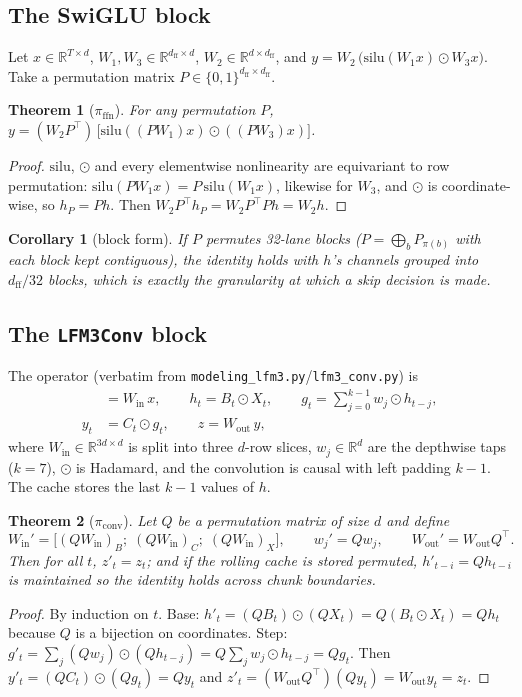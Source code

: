 \documentclass[11pt]{article}
\newtheorem{theorem}{Theorem}
\newtheorem{corollary}{Corollary}
\newcommand{\dff}{\ensuremath{d_{\mathrm{ff}}}}
\newcommand{\Wout}{\ensuremath{W_{\mathrm{out}}}}
\newcommand{\Win}{\ensuremath{W_{\mathrm{in}}}}
\newcommand{\pif}{\pi_{\mathrm{ffn}}}
\newcommand{\pic}{\pi_{\mathrm{conv}}}
\newcommand{\code}[1]{\texttt{\small #1}}
\begin{document}
\subsection{The SwiGLU block}
Let $x\in\mathbb{R}^{T\times d}$, $W_1,W_3\in\mathbb{R}^{\dff\times d}$,
$W_2\in\mathbb{R}^{d\times\dff}$, and $y = W_2\,\big(\mathrm{silu}(W_1x)\odot W_3x\big)$.
Take a permutation matrix $P\in\{0,1\}^{\dff\times\dff}$.

\begin{theorem}[$\pif$]
For any permutation $P$, $y = (W_2P^{\!\top})\,\big[\mathrm{silu}((PW_1)x)\odot((PW_3)x)\big]$.
\end{theorem}
\begin{proof}
$\mathrm{silu}$, $\odot$ and every elementwise nonlinearity are equivariant to row
permutation: $\mathrm{silu}(PW_1x) = P\,\mathrm{silu}(W_1x)$, likewise for $W_3$, and
$\odot$ is coordinate-wise, so $h_P = Ph$. Then $W_2P^{\!\top}h_P = W_2P^{\!\top}Ph = W_2h$.
\end{proof}

\begin{corollary}[block form]
If $P$ permutes \emph{32-lane blocks} ($P = \bigoplus_{b} P_{\pi(b)}$ with each block kept
contiguous), the identity holds with $h$'s channels grouped into $d_{\mathrm{ff}}/32$
blocks, which is exactly the granularity at which a skip decision is made.
\end{corollary}

\subsection{The \code{LFM3Conv} block}
The operator (verbatim from \code{modeling\_lfm3.py}/\code{lfm3\_conv.py}) is
\begin{align}
[\,B;C;X\,] &= \Win\,x, \qquad
h_t = B_t \odot X_t, \qquad
g_t = \textstyle\sum_{j=0}^{k-1} w_j \odot h_{t-j}, \label{eq:conv}\\
y_t &= C_t \odot g_t, \qquad z = \Wout\,y ,
\end{align}
where $\Win\in\mathbb{R}^{3d\times d}$ is split into three $d$-row slices, $w_j\in
\mathbb{R}^{d}$ are the depthwise taps ($k{=}7$), $\odot$ is Hadamard, and the
convolution is causal with left padding $k-1$. The cache stores the last $k-1$ values of
$h$.

\begin{theorem}[$\pic$]
Let $Q$ be a permutation matrix of size $d$ and define
\begin{equation}
\Win' = \big[(Q\Win)_{B};\;(Q\Win)_{C};\;(Q\Win)_{X}\big],\qquad
w_j' = Qw_j,\qquad \Wout' = \Wout Q^{\!\top}.
\end{equation}
Then for all $t$,
$z'_t = z_t$; and if the rolling cache is stored permuted, $h'_{t-i} = Qh_{t-i}$ is
maintained so the identity holds across chunk boundaries.
\end{theorem}
\begin{proof}
By induction on $t$. Base: $h'_t = (QB_t)\odot(QX_t) = Q(B_t\odot X_t) = Qh_t$ because
$Q$ is a bijection on coordinates. Step:
$g'_t = \sum_j (Qw_j)\odot(Qh_{t-j}) = Q\sum_j w_j\odot h_{t-j} = Qg_t$. Then
$y'_t = (QC_t)\odot(Qg_t) = Qy_t$ and $z'_t = (\Wout Q^{\!\top})(Qy_t) = \Wout y_t = z_t$.
\end{proof}
\end{document}

